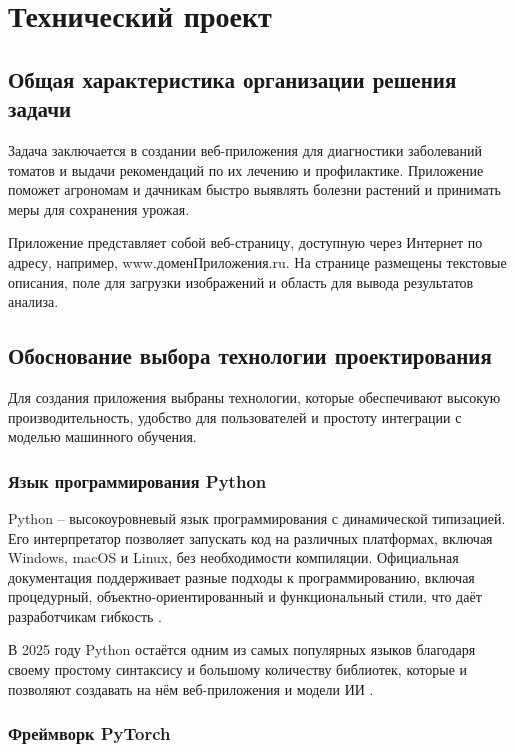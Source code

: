 \section{Технический проект}
\subsection{Общая характеристика организации решения задачи}

Задача заключается в создании веб-приложения для диагностики заболеваний томатов и выдачи рекомендаций по их лечению и профилактике. Приложение поможет агрономам и дачникам быстро выявлять болезни растений и принимать меры для сохранения урожая.

Приложение представляет собой веб-страницу, доступную через Интернет по адресу, например, www.доменПриложения.ru. На странице размещены текстовые описания, поле для загрузки изображений и область для вывода результатов анализа.

\subsection{Обоснование выбора технологии проектирования}

Для создания приложения выбраны технологии, которые обеспечивают высокую производительность, удобство для пользователей и простоту интеграции с моделью машинного обучения.

\subsubsection{Язык программирования Python}

Python -- высокоуровневый язык программирования с динамической типизацией. Его интерпретатор позволяет запускать код на различных платформах, включая Windows, macOS и Linux, без необходимости компиляции. Официальная документация поддерживает разные подходы к программированию, включая процедурный, объектно-ориентированный и функциональный стили, что даёт разработчикам гибкость\cite{python2} \cite{python3}. 

В 2025 году Python остаётся одним из самых популярных языков благодаря своему простому синтаксису и большому количеству  библиотек, которые и позволяют создавать на нём веб-приложения и модели ИИ \cite{python4}\cite{python1}.

\subsubsection{Фреймворк PyTorch}

